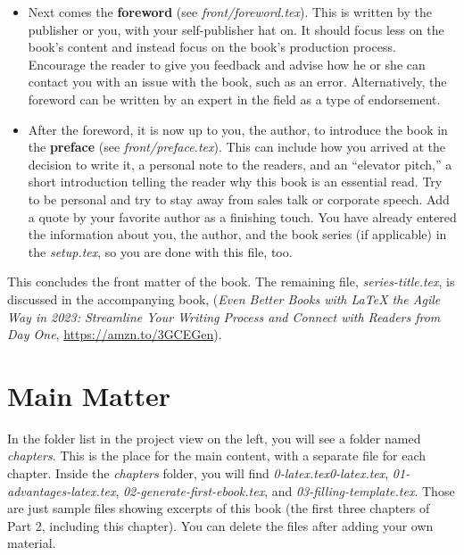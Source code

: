 \begin{itemize}
    \item Next comes the \textbf{foreword} (see \textit{front/foreword.tex}). This is written by the publisher or you, with your self-publisher hat on. It should focus less on the book's content and instead focus on the book's production process. Encourage the reader to give you feedback and advise how he or she can contact you with an issue with the book, such as an error. Alternatively, the foreword can be written by an expert in the field as a type of endorsement. 

    \item After the foreword, it is now up to you, the author, to introduce the book in the \textbf{preface} (see \textit{front/preface.tex}). This can include how you arrived at the decision to write it, a personal note to the readers, and an ``elevator pitch,'' a short introduction telling the reader why this book is an essential read. Try to be personal and try to stay away from sales talk or corporate speech. Add a quote by your favorite author as a finishing touch. You have already entered the information about you, the author, and the book series (if applicable) in the \textit{setup.tex}, so you are done with this file, too.

\end{itemize}

This concludes the front matter of the book. The remaining file, \textit{series-title.tex}, is discussed in the accompanying book, (\textit{Even Better Books with LaTeX the Agile Way in 2023: Streamline Your Writing Process and Connect with Readers from Day One}, \url{https://amzn.to/3GCEGen}).


\newpage\section{Main Matter}\label{mainmatter:sec}

In the folder list in the project view on the left, you will see a folder named \textit{chapters}. This is the place for the main content, with a separate file for each chapter. Inside the \textit{chapters} folder, you will find \textit{0-latex.tex}\textit{0-latex.tex}, \textit{01-advantages-latex.tex}, \textit{02-generate-first-ebook.tex}, and \textit{03-filling-template.tex}. Those are just sample files showing excerpts of this book (the first three chapters of Part 2, including this chapter). You can delete the files after adding your own material.


